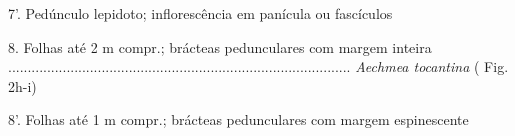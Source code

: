 \begin{customList1}
\begin{customList1}
\begin{customList1}
\begin{customList1}
\item \par{}7'.\allowbreak{} Pedúnculo lepidoto; inflorescência em panícula ou fascículos
\begin{customList1}
\item \par{}8.\allowbreak{} Folhas até 2 m compr.\allowbreak{}; brácteas pedunculares com margem inteira .\allowbreak{}.\allowbreak{}.\allowbreak{}.\allowbreak{}.\allowbreak{}.\allowbreak{}.\allowbreak{}.\allowbreak{}.\allowbreak{}.\allowbreak{}.\allowbreak{}.\allowbreak{}.\allowbreak{}.\allowbreak{}.\allowbreak{}.\allowbreak{}.\allowbreak{}.\allowbreak{}.\allowbreak{}.\allowbreak{}.\allowbreak{}.\allowbreak{}.\allowbreak{}.\allowbreak{}.\allowbreak{}.\allowbreak{}.\allowbreak{}.\allowbreak{}.\allowbreak{}.\allowbreak{}.\allowbreak{}.\allowbreak{}.\allowbreak{}.\allowbreak{}.\allowbreak{}.\allowbreak{}.\allowbreak{}.\allowbreak{}.\allowbreak{}.\allowbreak{}.\allowbreak{}.\allowbreak{}.\allowbreak{}.\allowbreak{}.\allowbreak{}.\allowbreak{}.\allowbreak{}.\allowbreak{}.\allowbreak{}.\allowbreak{}.\allowbreak{}.\allowbreak{}.\allowbreak{}.\allowbreak{}.\allowbreak{}.\allowbreak{}.\allowbreak{}.\allowbreak{}.\allowbreak{}.\allowbreak{}.\allowbreak{}.\allowbreak{}.\allowbreak{}.\allowbreak{}.\allowbreak{}.\allowbreak{}.\allowbreak{}.\allowbreak{}.\allowbreak{}.\allowbreak{}.\allowbreak{}.\allowbreak{}.\allowbreak{}.\allowbreak{}.\allowbreak{}.\allowbreak{}.\allowbreak{}.\allowbreak{}.\allowbreak{}.\allowbreak{}.\allowbreak{}.\allowbreak{}.\allowbreak{}.\allowbreak{}.\allowbreak{}.\allowbreak{}.\allowbreak{}.\allowbreak{} \textit{Aechmea tocantina} (\allowbreak{} Fig.\allowbreak{} 2h-\allowbreak{}i)\allowbreak{}
\item \par{}8'.\allowbreak{} Folhas até 1 m compr.\allowbreak{}; brácteas pedunculares com margem espinescente
\begin{customList1}

\end{customList1}
\end{customList1}
\end{customList1}
\end{customList1}
\end{customList1}
\end{customList1}
